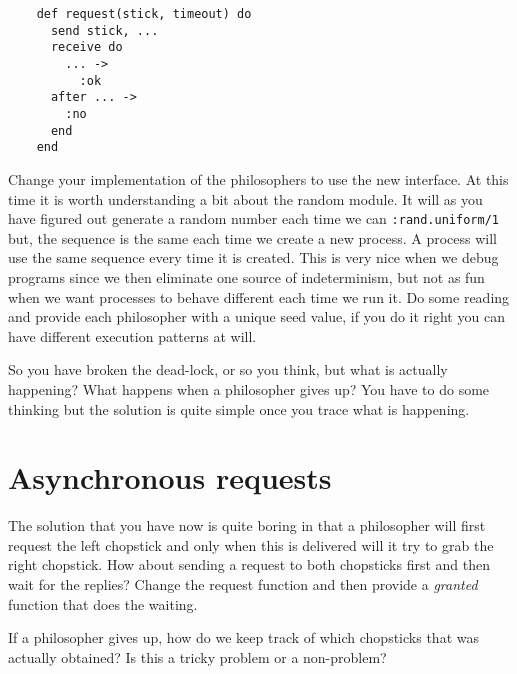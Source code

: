 \documentclass[a4paper,11pt]{article}
\begin{document}
    \begin{verbatim}
    def request(stick, timeout) do
      send stick, ...
      receive do
        ... -> 
          :ok
      after ... -> 
        :no
      end
    end
    \end{verbatim}
    
    Change your implementation of the philosophers to use the new
    interface. At this time it is worth understanding a bit about the
    random module. It will as you have figured out generate a random
    number each time we can {\tt :rand.uniform/1} but, the sequence is 
    the same each
    time we create a new process. A process will use the same sequence
    every time it is created. This is very nice when we debug programs
    since we then eliminate one source of indeterminism, but not as fun
    when we want processes to behave different each time we run it. Do
    some reading and provide each philosopher with a unique seed value, if
    you do it right you can have different execution patterns at will.
    
    So you have broken the dead-lock, or so you think, but what is
    actually happening? What happens when a philosopher gives up? You have
    to do some thinking but the solution is quite simple once you trace
    what is happening.
    
    
    
    \section{Asynchronous requests}
    
    The solution that you have now is quite boring in that a philosopher
    will first request the left chopstick and only when this is delivered
    will it try to grab the right chopstick. How about sending a request
    to both chopsticks first and then wait for the replies? Change the
    request function and then provide a {\em granted} function that does
    the waiting. 
    
    If a philosopher gives up, how do we keep track of which chopsticks
    that was actually obtained? Is this a tricky problem or a non-problem?
    
    
    
\end{document}
